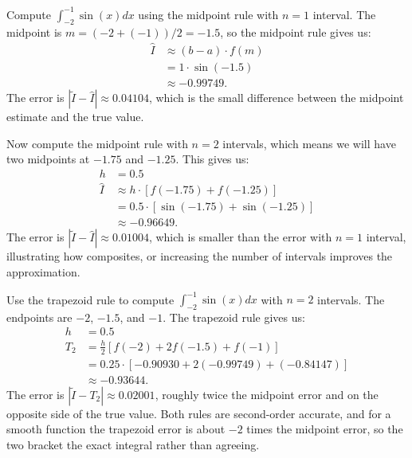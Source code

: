  Compute $\int_{-2}^{-1} \sin(x) dx$ using the midpoint rule with $n=1$ interval.
The midpoint is $m = (-2 + (-1))/2 = -1.5$, so the midpoint rule gives us:
\begin{align*}
    \hat{I} &\approx (b - a) \cdot f(m) \\
      &= 1 \cdot \sin(-1.5) \\
      &\approx -0.99749.
\end{align*}
The error is $|\tilde{I} - \hat{I}| \approx 0.04104$, which is the small difference between the midpoint estimate and the true value.


 Now compute the midpoint rule with $n=2$ intervals, which means we will have two midpoints at $-1.75$ and $-1.25$.
This gives us: 
\begin{align*}
    h &= 0.5 \\
    \hat{I} &\approx h \cdot [f(-1.75) + f(-1.25)] \\
      &= 0.5 \cdot [\sin(-1.75) + \sin(-1.25)] \\
      &\approx -0.96649.
\end{align*}
The error is $|\tilde{I} - \hat{I}| \approx 0.01004$, which is smaller than the error with $n=1$ interval, illustrating how composites, or increasing the number of intervals improves the approximation.


Use the trapezoid rule to compute $\int_{-2}^{-1} \sin(x) dx$ with $n=2$ intervals.
The endpoints are $-2$, $-1.5$, and $-1$. The trapezoid rule gives us:
\begin{align*}
    h &= 0.5 \\
    T_2 &= \frac{h}{2} [f(-2) + 2f(-1.5) + f(-1)] \\
        &= 0.25 \cdot [-0.90930 + 2(-0.99749) + (-0.84147)] \\
        &\approx -0.93644.
\end{align*}
The error is $|\tilde{I} - T_2| \approx 0.02001$, roughly twice the midpoint error and on the opposite side of the true value. Both rules are second-order accurate, and for a smooth function the trapezoid error is about $-2$ times the midpoint error, so the two bracket the exact integral rather than agreeing.




